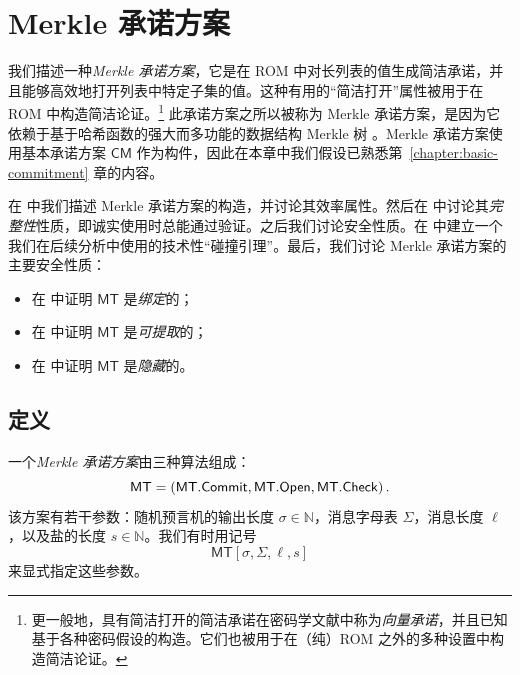 \documentclass[american,singlepageview]{snargs-book-zh}
\renewcommand{\enspace}{\ensuremath{\thinspace}}
\newcommand{\Naturals}{\mathbb{N}}
\newcommand{\ProtoAlphabet}{\Sigma}
\newcommand{\ROOutputSize}{\sigma}
\newcommand{\CMSymbol}{\mathsf{CM}}
\newcommand{\CMMessageLength}{\ell}
\newcommand{\MTSymbol}{\mathsf{MT}}
\newcommand{\MTConstructor}[4]{\MTSymbol[#1,#2,#3,#4]}
\newcommand{\MTCommit}{\MTSymbol.\mathsf{Commit}}
\newcommand{\MTOpen}{\MTSymbol.\mathsf{Open}}
\newcommand{\MTCheck}{\MTSymbol.\mathsf{Check}}
\newcommand{\MTMessageLength}{\CMMessageLength}
\newcommand{\MTSaltSize}{s}
\newcommand{\MTAlphabet}{\ProtoAlphabet}
\begin{document}
\chapter{Merkle 承诺方案}
\label{chapter:merkle-commitment}

我们描述一种\emph{Merkle 承诺方案}，它是在 ROM 中对长列表的值生成简洁承诺，并且能够高效地打开列表中特定子集的值。这种有用的“简洁打开”属性被用于在 ROM 中构造简洁论证。\footnote{更一般地，具有简洁打开的简洁承诺在密码学文献中称为\emph{向量承诺}，并且已知基于各种密码假设的构造。它们也被用于在（纯）ROM 之外的多种设置中构造简洁论证。} 此承诺方案之所以被称为 Merkle 承诺方案，是因为它依赖于基于哈希函数的强大而多功能的数据结构 Merkle 树 \cite{Merkle89-tree}。Merkle 承诺方案使用基本承诺方案 $\CMSymbol$ 作为构件，因此在本章中我们假设已熟悉第~\ref{chapter:basic-commitment} 章的内容。

 在  中我们描述 Merkle 承诺方案的构造，并讨论其效率属性。然后在  中讨论其\emph{完整性}性质，即诚实使用时总能通过验证。之后我们讨论安全性质。在  中建立一个我们在后续分析中使用的技术性“碰撞引理”。最后，我们讨论 Merkle 承诺方案的主要安全性质：
\begin{itemize}[noitemsep]
  \item 在  中证明 $\MTSymbol$ 是\emph{绑定}的；
  \item 在  中证明 $\MTSymbol$ 是\emph{可提取}的；
  \item 在  中证明 $\MTSymbol$ 是\emph{隐藏}的。
\end{itemize}

\section{定义}
\label{section:merkle-commitment-definition}

一个\emph{Merkle 承诺方案}由三种算法组成：
\begin{equation*}
\MTSymbol = (\MTCommit,\MTOpen,\MTCheck)
\enspace.
\end{equation*}
该方案有若干参数：随机预言机的输出长度 $\ROOutputSize\in\Naturals$，消息字母表 $\MTAlphabet$，消息长度 $\MTMessageLength$，以及盐的长度 $\MTSaltSize\in\Naturals$。我们有时用记号
\[
\MTConstructor{\ROOutputSize}{\MTAlphabet}{\MTMessageLength}{\MTSaltSize}
\]
来显式指定这些参数。
\end{document}
